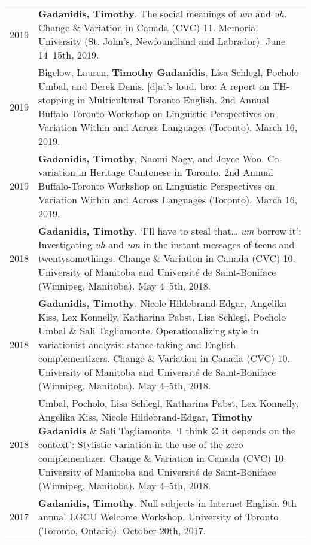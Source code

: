 \documentclass[letterpaper]{article}
\begin{document}
\begin{tabular}{p{}p{}}
    2019 & \textbf{Gadanidis, Timothy}. The social meanings of \emph{um} and
    \emph{uh}. Change \& Variation in Canada (CVC) 11. Memorial University (St.
    John's, Newfoundland and Labrador). June 14--15th, 2019. \\
    2019 & Bigelow, Lauren, \textbf{Timothy Gadanidis}, Lisa Schlegl, Pocholo
    Umbal, and Derek Denis.  [d]at's loud, bro: A report on TH-stopping in
    Multicultural Toronto English.  2nd Annual Buffalo-Toronto Workshop on
    Linguistic Perspectives on Variation Within and Across Languages (Toronto).
    March 16, 2019. \\
    2019 & \textbf{Gadanidis, Timothy}, Naomi Nagy, and Joyce Woo.  Co-variation
    in Heritage Cantonese in Toronto.  2nd Annual Buffalo-Toronto Workshop on
    Linguistic Perspectives on Variation Within and Across Languages (Toronto).
    March 16, 2019. \\
    2018 & \textbf{Gadanidis, Timothy}.  `I'll have to steal that\ldots{}
    \emph{um} borrow it': Investigating \emph{uh} and \emph{um} in the instant
    messages of teens and twentysomethings.  Change \& Variation in Canada (CVC)
    10. University of Manitoba and Université de Saint-Boniface (Winnipeg,
    Manitoba). May 4--5th, 2018. \\
    2018 & \textbf{Gadanidis, Timothy}, Nicole Hildebrand-Edgar, Angelika Kiss,
    Lex Konnelly, Katharina Pabst, Lisa Schlegl, Poc\-holo Umbal \& Sali
    Tagliamonte.  Operationalizing style in variationist analysis: stance-taking
    and English complementizers.  Change \& Variation in Canada (CVC) 10.
    University of Manitoba and Université de Saint-Boniface (Winnipeg,
    Manitoba). May 4--5th, 2018. \\
    2018 & Umbal, Pocholo, Lisa Schlegl, Katharina Pabst, Lex Konnelly, Angelika
    Kiss, Nicole Hildebrand-Edgar, \textbf{Timothy Gadanidis} \& Sali
    Tagliamonte.  `I think ∅ it depends on the context': Stylistic variation in
    the use of the zero complementizer.  Change \& Variation in Canada (CVC) 10.
    University of Manitoba and Université de Saint-Boniface (Winnipeg,
    Manitoba). May 4--5th, 2018. \\
    2017 & \textbf{Gadanidis, Timothy}.  Null subjects in Internet English.  9th
    annual LGCU Welcome Workshop. University of Toronto (Toronto, Ontario).
    October 20th, 2017. \\
\end{tabular}
\end{document}
